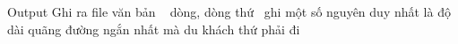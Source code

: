 Output
Ghi ra file văn bản   dòng, dòng thứ  ghi một số nguyên duy nhất là độ dài quãng đường ngắn nhất mà du khách thứ phải đi